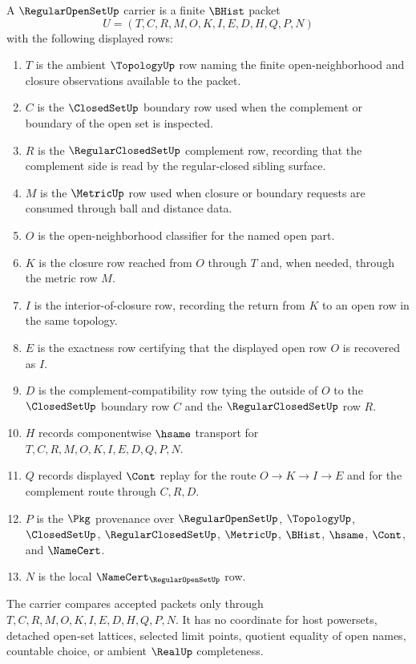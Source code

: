 \begin{definition}\label{def:regular-open-set-carrier}
A $\RegularOpenSetUp$ carrier is a finite $\BHist$ packet
$$
U=(T,C,R,M,O,K,I,E,D,H,Q,P,N)
$$
with the following displayed rows:
\begin{enumerate}
\item $T$ is the ambient $\TopologyUp$ row naming the finite open-neighborhood and closure observations available to the packet.
\item $C$ is the $\ClosedSetUp$ boundary row used when the complement or boundary of the open set is inspected.
\item $R$ is the $\RegularClosedSetUp$ complement row, recording that the complement side is read by the regular-closed sibling surface.
\item $M$ is the $\MetricUp$ row used when closure or boundary requests are consumed through ball and distance data.
\item $O$ is the open-neighborhood classifier for the named open part.
\item $K$ is the closure row reached from $O$ through $T$ and, when needed, through the metric row $M$.
\item $I$ is the interior-of-closure row, recording the return from $K$ to an open row in the same topology.
\item $E$ is the exactness row certifying that the displayed open row $O$ is recovered as $I$.
\item $D$ is the complement-compatibility row tying the outside of $O$ to the $\ClosedSetUp$ boundary row $C$ and the $\RegularClosedSetUp$ row $R$.
\item $H$ records componentwise $\hsame$ transport for $T,C,R,M,O,K,I,E,D,Q,P,N$.
\item $Q$ records displayed $\Cont$ replay for the route $O \to K \to I \to E$ and for the complement route through $C,R,D$.
\item $P$ is the $\Pkg$ provenance over $\RegularOpenSetUp$, $\TopologyUp$, $\ClosedSetUp$, $\RegularClosedSetUp$, $\MetricUp$, $\BHist$, $\hsame$, $\Cont$, and $\NameCert$.
\item $N$ is the local $\NameCert_{\RegularOpenSetUp}$ row.
\end{enumerate}
The carrier compares accepted packets only through $T,C,R,M,O,K,I,E,D,H,Q,P,N$. It has no coordinate for host powersets, detached open-set lattices, selected limit points, quotient equality of open names, countable choice, or ambient $\RealUp$ completeness.
\end{definition}

